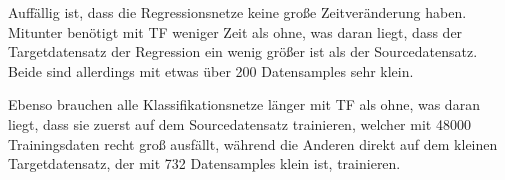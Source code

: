 Auffällig ist, dass die Regressionsnetze keine große Zeitveränderung haben. Mitunter benötigt mit TF weniger Zeit als ohne, was daran liegt, dass 
der Targetdatensatz der Regression ein wenig größer ist als der Sourcedatensatz. Beide sind allerdings mit etwas über 200 Datensamples sehr klein. 

Ebenso brauchen alle Klassifikationsnetze länger mit TF als ohne, was daran liegt, dass sie zuerst auf dem Sourcedatensatz trainieren, welcher mit 
48000 Trainingsdaten recht groß ausfällt, während die Anderen direkt auf dem kleinen Targetdatensatz, der mit 732 Datensamples klein ist, 
trainieren. 

